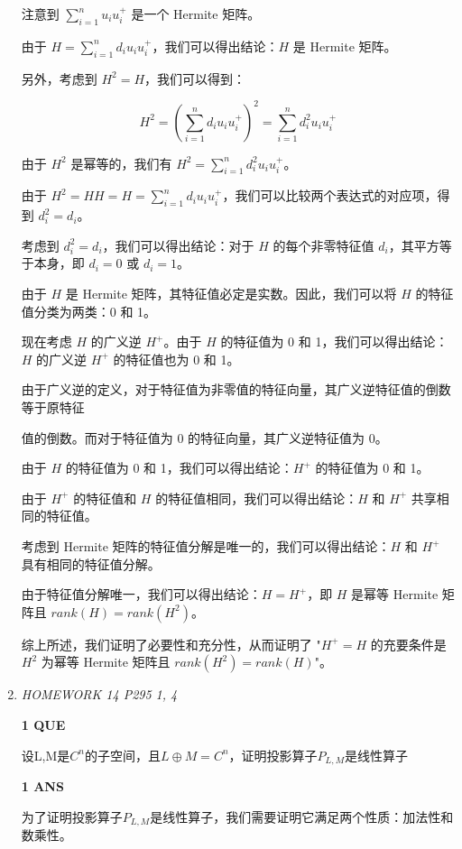 \documentclass[11pt,letterpaper]{ctexart}
\begin{document}
\begin{enumerate}
注意到 $\sum_{i=1}^n u_i u_i^{+}$ 是一个 Hermite 矩阵。

由于 $H = \sum_{i=1}^n d_i u_i u_i^{+}$，我们可以得出结论：$H$ 是 Hermite 矩阵。

另外，考虑到 $H^2 = H$，我们可以得到：

$$H^2 = \left(\sum_{i=1}^n d_i u_i u_i^{+}\right)^2 = \sum_{i=1}^n d_i^2 u_i u_i^{+}$$

由于 $H^2$ 是幂等的，我们有 $H^2 = \sum_{i=1}^n d_i^2 u_i u_i^{+}$。

由于 $H^2 = HH = H = \sum_{i=1}^n d_i u_i u_i^{+}$，我们可以比较两个表达式的对应项，得到 $d_i^2 = d_i$。

考虑到 $d_i^2 = d_i$，我们可以得出结论：对于 $H$ 的每个非零特征值 $d_i$，其平方等于本身，即 $d_i = 0$ 或 $d_i = 1$。

由于 $H$ 是 Hermite 矩阵，其特征值必定是实数。因此，我们可以将 $H$ 的特征值分类为两类：0 和 1。

现在考虑 $H$ 的广义逆 $H^{+}$。由于 $H$ 的特征值为 0 和 1，我们可以得出结论：$H$ 的广义逆 $H^{+}$ 的特征值也为 0 和 1。

由于广义逆的定义，对于特征值为非零值的特征向量，其广义逆特征值的倒数等于原特征

值的倒数。而对于特征值为 0 的特征向量，其广义逆特征值为 0。

由于 $H$ 的特征值为 0 和 1，我们可以得出结论：$H^{+}$ 的特征值为 0 和 1。

由于 $H^{+}$ 的特征值和 $H$ 的特征值相同，我们可以得出结论：$H$ 和 $H^{+}$ 共享相同的特征值。

考虑到 Hermite 矩阵的特征值分解是唯一的，我们可以得出结论：$H$ 和 $H^{+}$ 具有相同的特征值分解。

由于特征值分解唯一，我们可以得出结论：$H = H^{+}$，即 $H$ 是幂等 Hermite 矩阵且 $rank(H) = rank(H^2)$。

综上所述，我们证明了必要性和充分性，从而证明了 "$H^{+} = H$ 的充要条件是 $H^2$ 为幂等 Hermite 矩阵且 $rank(H^2) = rank(H)$"。


\item \textit{HOMEWORK 14 {P295 1, 4}}%

\textbf{1 QUE}
\bigskip

设L,M是$C_{}^{n}$的子空间，且$L \oplus M = C_{}^{n}$，证明投影算子$P_{L,M}$是线性算子


\textbf{1 ANS}
\bigskip

为了证明投影算子$P_{L,M}$是线性算子，我们需要证明它满足两个性质：加法性和数乘性。


\end{enumerate}
\end{document}
